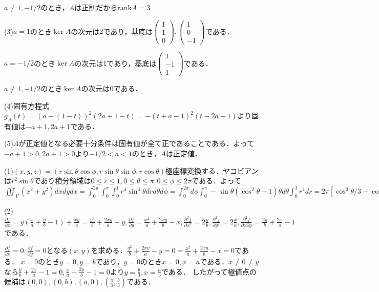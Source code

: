 \documentclass[
		book,
		head_space=20mm,
		foot_space=20mm,
		gutter=10mm,
		line_length=190mm
]{jlreq}
\begin{document}
    $a \neq 1,-1/2$のとき，$A$は正則だから$\mathrm{rank} A=3$

    (3)$a=1$のとき$\ker A$の次元は$2$であり，基底は$\begin{pmatrix}
        1 \\
        1 \\
        0
    \end{pmatrix},\begin{pmatrix}
        1 \\
        0 \\
        -1
    \end{pmatrix}$である．

    $a=-1/2$のとき$\ker A$の次元は$1$であり，基底は$\begin{pmatrix}
        1 \\
        -1 \\
        1 
    \end{pmatrix}$である．

    $a \neq 1,-1/2$のとき$\ker A$の次元は$0$である．

    (4)固有方程式$g_A(t)=(a-(1-t))^2(2a+1-t)=-(t+a-1)^2(t-2a-1)$より固有値は$-a+1,2a+1$である．

    (5)$A$が正定値となる必要十分条件は固有値が全て正であることである．よって$-a+1>0,2a+1>0$より$-1/2<a<1$のとき，$A$は正定値．

    (1)$(x,y,z)=(r\sin\theta\cos\phi,r\sin\theta\sin\phi,r\cos\theta)$極座標変換する．ヤコビアンは$r^2\sin\theta$であり積分領域は$0\le r \le 1,0\le \theta \le \pi,0\le \phi \le 2\pi$である．よって
    $\iiint_V (x^2+y^2)dxdydx=\int_0^{2\pi}\int_0^{\pi}\int_0^1 r^4 \sin^3 \theta dr d\theta d\phi=\int_0^{2\pi}d\phi \int_0^{\pi} -\sin\theta(\cos^2\theta-1) \theta d\theta \int_0^1 r^4 dr=2\pi [\cos^3\theta/3-\cos\theta]_0^{\pi} \frac{1}{5}= \frac{8\pi}{15}$

    (2)$\frac{\partial f}{\partial x}=y(\frac{x}{a}+\frac{y}{b}-1)+\frac{xy}{a}=\frac{y^2}{b}+\frac{2xy}{a}-y,\frac{\partial f}{\partial y}=
    \frac{x^2}{a}+\frac{2xy}{b}-x,\frac{\partial^2 f}{\partial x^2}=2\frac{y}{b},\frac{\partial^2 f}{\partial y^2}=2\frac{x}{a},\frac{\partial^2 f}{\partial x \partial y}=\frac{2y}{b}+\frac{2x}{a}-1$である．

    $\frac{\partial f}{\partial x}=0,\frac{\partial f}{\partial y}=0$となる$(x,y)$を求める．$\frac{y^2}{b}+\frac{2xy}{a}-y=0=\frac{x^2}{a}+\frac{2xy}{b}-x=0$である．
    $x=0$のとき$y=0,y=b$であり，$y=0$のとき$x=0,x=a$である．$x\neq0 \neq y$なら$\frac{y}{b}+\frac{2x}{a}-1=0,\frac{x}{a}+\frac{2y}{b}-1=0$より$y=\frac{b}{3},x=\frac{a}{3}$である．
    したがって極値点の候補は$(0,0),(0,b),(a,0),(\frac{a}{3},\frac{b}{3})$である．
\end{document}
